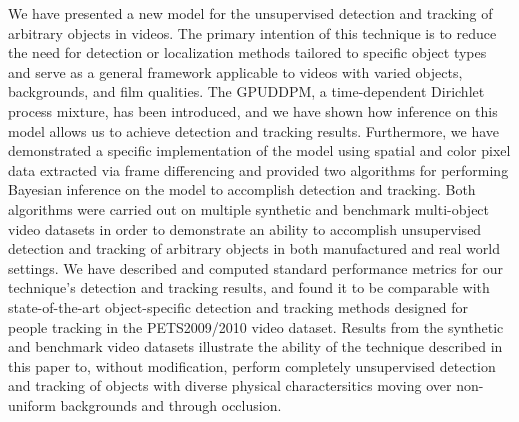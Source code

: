 \documentclass[twocolumn, final]{svjour3}
\begin{document}
We have presented a new model for the unsupervised detection and tracking of arbitrary objects in videos. The primary intention of this technique is to reduce the need for detection or localization methods tailored to specific object types and serve as a general framework applicable to videos with varied objects, backgrounds, and film qualities. The GPUDDPM, a time-dependent Dirichlet process mixture, has been introduced, and we have shown how inference on this model allows us to achieve detection and tracking results. Furthermore, we have demonstrated a specific implementation of the model using spatial and color pixel data extracted via frame differencing and provided two algorithms for performing Bayesian inference on the model to accomplish detection and tracking. Both algorithms were carried out on multiple synthetic and benchmark multi-object video datasets in order to demonstrate an ability to accomplish unsupervised detection and tracking of arbitrary objects in both manufactured and real world settings. We have described and computed standard performance metrics for our technique's detection and tracking results, and found it to be comparable with state-of-the-art object-specific detection and tracking methods designed for people tracking in the PETS2009/2010 video dataset. Results from the synthetic and benchmark video datasets illustrate the ability of the technique described in this paper to, without modification, perform completely unsupervised detection and tracking of objects with diverse physical charactersitics moving over non-uniform backgrounds and through occlusion.




\begin{small}

 
\end{small}
\end{document}

